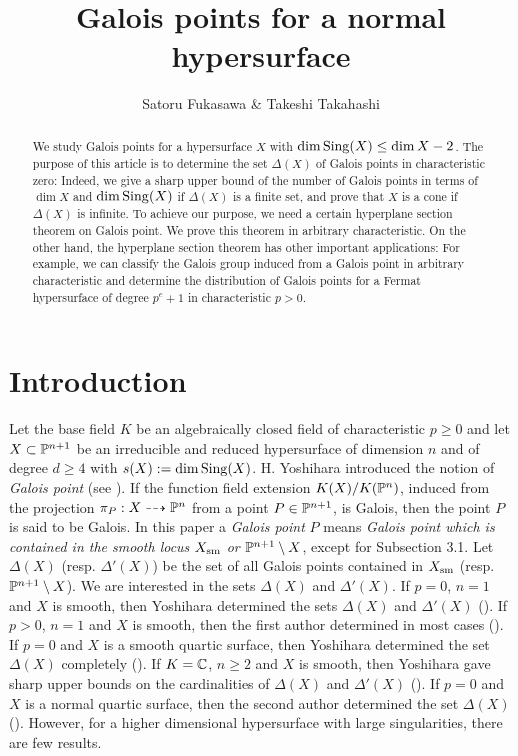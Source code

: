 \documentclass[10pt,oneside]{amsart}
\title{Galois points for a normal hypersurface}
\author{Satoru Fukasawa \& Takeshi Takahashi}
\theoremstyle{definition}
\begin{document}
\begin{abstract} 
We study Galois points for a hypersurface $X$ with $\dim {\rm Sing}(X) \le \dim X-2$. 
The purpose of this article is to determine the set $\Delta(X)$ of Galois points in characteristic zero: Indeed, we give a sharp upper bound of the number of Galois points in terms of $\dim X$ and $\dim {\rm Sing}(X)$ if $\Delta(X)$ is a finite set, and prove that $X$ is a cone if $\Delta(X)$ is infinite.  
To achieve our purpose, we need a certain hyperplane section theorem on Galois point. 
We prove this theorem in arbitrary characteristic. 
On the other hand, the hyperplane section theorem has other important applications: For example, we can classify the Galois group induced from a Galois point in arbitrary characteristic and determine the distribution of Galois points for a Fermat hypersurface of degree $p^e+1$ in characteristic $p>0$. 
\end{abstract}
\maketitle

\section{Introduction}  
Let the base field $K$ be an algebraically closed field of characteristic $p \ge 0$ and let $X \subset \Bbb P^{n+1}$ be an irreducible and reduced hypersurface of dimension $n$ and of degree $d \ge 4$ with $s(X):=\dim {\rm Sing}(X)$. 
H. Yoshihara introduced the notion of {\it Galois point} (see \cite{fukasawa2, miura-yoshihara, yoshihara1, yoshihara2, yoshihara3}). 
If the function field extension $K(X)/K(\Bbb P^n)$, induced from the projection $\pi_P:X \dashrightarrow \Bbb P^n$ from a point $P \in \Bbb P^{n+1}$, is Galois, then the point $P$ is said to be Galois. 
In this paper a {\it Galois point} $P$ means {\it Galois point which is contained in the smooth locus $X_{\rm sm}$ or $\Bbb P^{n+1} \setminus X$}, except for Subsection 3.1. 
Let $\Delta(X)$ (resp. $\Delta'(X)$) be the set of all Galois points contained in $X_{\rm sm}$ (resp. $\Bbb P^{n+1} \setminus X$). 
We are interested in the sets $\Delta(X)$ and $\Delta'(X)$. 
If $p=0$, $n=1$ and $X$ is smooth, then Yoshihara determined the sets $\Delta(X)$ and $\Delta'(X)$ (\cite{yoshihara1}). 
If $p>0$, $n=1$ and $X$ is smooth, then the first author determined in most cases (\cite{fukasawa1, fukasawa2}). 
If $p=0$ and $X$ is a smooth quartic surface, then Yoshihara determined the set $\Delta(X)$ completely (\cite{yoshihara2}). 
If $K=\Bbb C$, $n \ge 2$ and $X$ is smooth, then Yoshihara gave sharp upper bounds on the cardinalities of $\Delta(X)$ and $\Delta'(X)$ (\cite{yoshihara3}). 
If $p=0$ and $X$ is a normal quartic surface, then the second author determined the set $\Delta(X)$ (\cite{takahashi}). 
However, for a higher dimensional hypersurface with large singularities, there are few results. 
\end{document}
